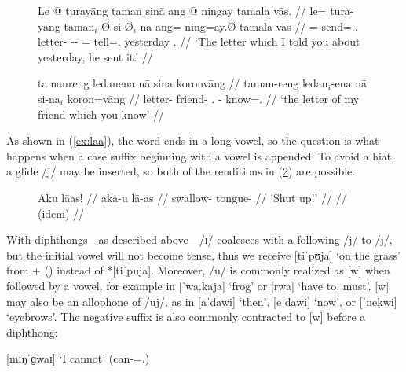 \begin{figure}[h]
\pex\label{ex:relmorphophon}
\a\label{ex:relmorphophon_1}%
\begingl
	\gla Le @ turayāng taman sinā ang @ ningay tamala vās. //
	\glb le= tura-yāng taman$_i$-Ø si-Ø$_i$-na ang= ning=ay.Ø 
		tamala vās //
	\glc \PatTI{}= send=\Tsg{}.\M{}.\Aarg{} letter-\Top{} 
		\Rel{}-\PatTI{}-\Gen{} \AgtT{}= tell=\Fsg{}.\Top{} yesterday 
		\Ssg{}.\Parg{} //
	\glft `The letter which I told you about yesterday, he sent it.' //
\endgl

\a\label{ex:relmorphophon_2}%
\begingl
	\gla tamanreng ledanena nā sina koronvāng //
	\glb taman-reng ledan$_i$-ena nā si-na$_i$ koron=vāng //
	\glc letter-\AargI{} friend-\Gen{} \Fsg.\Gen{} \Rel{}-\Gen{} 
		know=\Ssg{}.\Aarg{} //
	\glft `the letter of my friend which you know' //
\endgl
\xe
\end{figure}

As shown in (\ref{ex:laa}), the word  ends in a long
vowel, so the question is what happens when a case suffix beginning with a
vowel is appended. To avoid a hiat, a glide /j/ may be inserted, so both of the
renditions in (\ref{ex:hiat}) are possible.

\begin{figure}[h]
\pex\label{ex:hiat}
	\a\begingl
		\gla Aku lāas! //
		\glb aka-u lā-as //
		\glc swallow-\Imp{} tongue-\Parg{} //
		\glft `Shut up!' //
	\endgl
	\a\begingl
		 //
		\glft (idem) //
	\endgl
\xe
\end{figure}

With diphthongs---as described above---/ɪ/ coalesces with a following /j/ to
/j/, but the initial vowel will not become tense, thus we receive
 [tiˈpʊja] `on the grass' from
 +  (\Loc{}) instead of *[tiˈpuja].
Moreover, /u/ is commonly realized as [w] when followed by a vowel, for example
in  [ˈwaːkaja] `frog' or  [rwa] `have
to, must'. [w] may also be an allophone of /uj/, as in 
[aˈdawi] `then',  [eˈdawi] `now', or 
[ˈnekwi] `eyebrows'. The negative suffix  is also commonly
contracted to [w] before a diphthong:

\ex
	 [mɪŋˈɡwaɪ] 
		`I cannot' (can-\Neg{}=\Fsg{}.\Top{})
\xe

%
%

